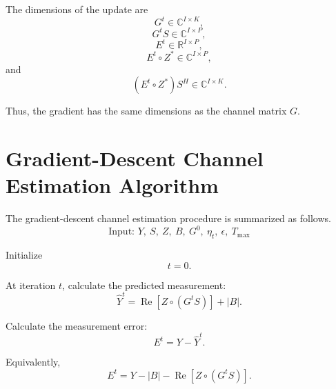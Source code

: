 \documentclass[12pt,a4paper]{article}
\begin{document}
The dimensions of the update are
\begin{equation}
G^{t}\in\mathbb{C}^{I\times K},
\tag{206}
\end{equation}
\begin{equation}
G^{t}S\in\mathbb{C}^{I\times P},
\tag{207}
\end{equation}
\begin{equation}
E^{t}\in\mathbb{R}^{I\times P},
\tag{208}
\end{equation}
\begin{equation}
E^{t}\circ Z^*\in\mathbb{C}^{I\times P},
\tag{209}
\end{equation}
and
\begin{equation}
(E^{t}\circ Z^*)S^H\in\mathbb{C}^{I\times K}.
\tag{210}
\end{equation}

Thus, the gradient has the same dimensions as the channel matrix $G$.

\section{Gradient-Descent Channel Estimation Algorithm}

The gradient-descent channel estimation procedure is summarized as
follows.
\begin{equation}
\boxed{
\text{Input: }
Y,\ S,\ Z,\ B,\ G^{0},\ \eta_t,\ \epsilon,\ T_{\max}
}
\tag{211}
\end{equation}

Initialize
\begin{equation}
t=0.
\tag{212}
\end{equation}

At iteration $t$, calculate the predicted measurement:
\begin{equation}
\boxed{
\widehat Y^{t}
=
\operatorname{Re}[Z\circ(G^{t}S)]
+
|B|
}.
\tag{213}
\end{equation}

Calculate the measurement error:
\begin{equation}
\boxed{
E^{t}
=
Y-\widehat Y^{t}
}.
\tag{214}
\end{equation}

Equivalently,
\begin{equation}
\boxed{
E^{t}
=
Y-|B|-\operatorname{Re}[Z\circ(G^{t}S)]
}.
\tag{215}
\end{equation}
\end{document}
